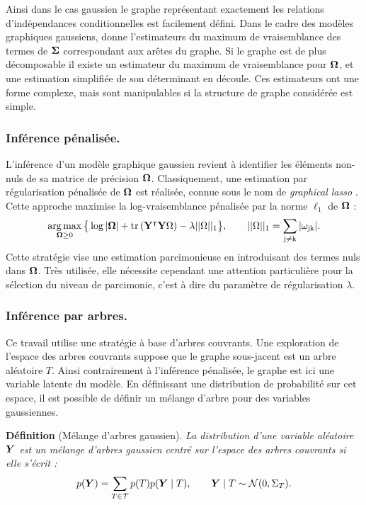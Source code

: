   Ainsi dans le cas gaussien le graphe représentant exactement les relations d'indépendances conditionnelles est facilement défini. Dans le cadre des modèles graphiques gaussiens, \citet{Lau96} donne l'estimateurs du maximum de vraisemblance des termes de ${\boldsymbol{\Sigma}}$ correspondant aux arêtes du graphe. Si le graphe est de plus décomposable il existe un estimateur du maximum de vraisemblance pour ${\boldsymbol{\Omega}}$, et une estimation simplifiée de son déterminant en découle. Ces estimateurs ont une forme complexe, mais sont manipulables si la structure de graphe considérée est simple.\\
  
  \subsubsection*{Inférence pénalisée.}
  L'inférence d'un modèle graphique gaussien revient à identifier les éléments non-nuls de sa matrice de précision ${\boldsymbol{\Omega}}$. Classiquement, une estimation par régularisation pénalisée de ${\boldsymbol{\Omega}}$ est réalisée, connue sous le nom de \textit{graphical lasso} \citep{FHT08}. Cette approche maximise la log-vraisemblance pénalisée par la norme $\ell_1$ de ${\boldsymbol{\Omega}}$ :
 $$\operatorname*{arg\,max}_{{\boldsymbol{\Omega}}\geq 0} \big\{\log |{\boldsymbol{\Omega}}| +\rm tr\left( {\bf Y}^\intercal {\bf Y} {\boldsymbol{\Omega}} \right) - \lambda ||{\boldsymbol{\Omega}}||_1\big\}, \qquad ||{\boldsymbol{\Omega}}||_1 = \sum_{j\neq k} |\omega_{jk}|.$$
  Cette stratégie vise une estimation parcimonieuse en introduisant des termes nuls dans ${\boldsymbol{\Omega}}$. Très utilisée, elle nécessite cependant une attention particulière pour la sélection du niveau de parcimonie, c'est à dire du paramètre de régularisation $\lambda$.\\
  
    \subsubsection*{Inférence par arbres.}
  Ce travail utilise une stratégie à base d'arbres couvrants. Une exploration de l'espace des arbres couvrants suppose que le graphe sous-jacent est un arbre aléatoire $T$. Ainsi contrairement à l'inférence pénalisée, le graphe est ici une variable latente du modèle. En définissant une distribution de probabilité sur cet espace, il est possible de définir un mélange d'arbre \citep{MixtTrees} pour des variables gaussiennes.
   
\textbf{Définition} (Mélange d'arbres gaussien). \textit{La distribution d'une variable aléatoire ${\boldsymbol{Y}}$ est un mélange d'arbres gaussien centré sur l'espace des arbres couvrants si elle s'écrit :
$$p({\boldsymbol{Y}}) = \sum_{T\in \mathcal{T}} p(T) p({\boldsymbol{Y}} \mid T), \qquad {\boldsymbol{Y}}\mid T \sim \mathcal{N}(0, \Sigma_T).$$}

